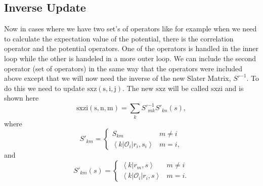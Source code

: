\documentclass[12pt]{extarticle}
\newcommand{\Oi}{\mathcal{O}_{i}}
\newcommand{\ket}[1]{\left| #1 \right>}
\newcommand{\bra}[1]{\left< #1 \right|}
\newcommand{\braket}[2]{\left< #1 | #2 \right>}
\begin{document}
\subsection{Inverse Update}
Now in cases where we have two set's of operators like for example when we need to calculate the expectation value of the potential, there is the correlation operator and the potential operators. One of the operators is handled in the inner loop while the other is handeled in a more outer loop. We can include the second operator (set of operators) in the same way that the operators were included above except that we will now need the inverse of the new Slater Matrix, $S'^{-1}$. To do this we need to update $\mathrm{sxz(s,i,j)}$. The new $\mathrm{sxz}$ will be called $\mathrm{sxzi}$ and is shown here
\begin{equation}
  \mathrm{sxzi(s,n,m)} = \sum_k S'^{-1}_{mk}S'_{kn}(s),
\end{equation}
where
\begin{equation}
  S'_{km} = \begin{cases}
	 S_{km} & m \neq i \\
	 \bra{k} \Oi \ket{r_i,s_i} & m=i,
  \end{cases}
\end{equation}
and
\begin{equation}
  S'_{km}(s) = \begin{cases}
	 \braket{k}{r_m,s} & m \neq i \\
	 \bra{k} \Oi \ket{r_i,s} & m=i.
  \end{cases}
\end{equation}
\end{document}
